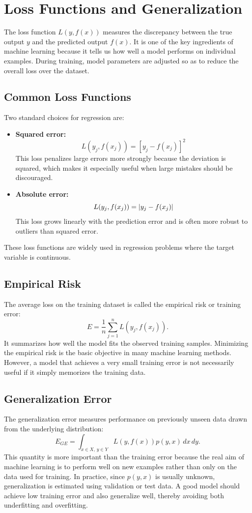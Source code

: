 \documentclass[english,12pt,a4paper]{report}
\begin{document}
	\section{Loss Functions and Generalization}
	\hspace{1.15em}The loss function $L(y,f(x))$ measures the discrepancy between the true output $y$ and the predicted output $f(x)$. It is one of the key ingredients of machine learning because it tells us how well a model performs on individual examples. During training, model parameters are adjusted so as to reduce the overall loss over the dataset.
	
	\subsection{Common Loss Functions}
	\hspace{1.15em}Two standard choices for regression are:
	\begin{itemize}
		\item \textbf{Squared error:} \[L(y_j,f(x_j))=[y_j-f(x_j)]^2\]
		This loss penalizes large errors more strongly because the deviation is squared, which makes it especially useful when large mistakes should be discouraged.
		\item \textbf{Absolute error:} \[L(y_j,f(x_j))=\abs{y_j-f(x_j)}\]
		This loss grows linearly with the prediction error and is often more robust to outliers than squared error.
	\end{itemize}
	These loss functions are widely used in regression problems where the target variable is continuous.
	
	\subsection{Empirical Risk}
	\hspace{1.15em}The average loss on the training dataset is called the empirical risk or training error:
	\[
	E=\frac{1}{n}\sum_{j=1}^{n}L(y_j,f(x_j)).
	\]
	It summarizes how well the model fits the observed training samples. Minimizing the empirical risk is the basic objective in many machine learning methods. However, a model that achieves a very small training error is not necessarily useful if it simply memorizes the training data.
	
	\subsection{Generalization Error}
	\hspace{1.15em}The generalization error measures performance on previously unseen data drawn from the underlying distribution:
	\[
	E_{GE}=\int_{x\in X,\,y\in Y}L(y,f(x))p(y,x)\,dx\,dy.
	\]
	This quantity is more important than the training error because the real aim of machine learning is to perform well on new examples rather than only on the data used for training. In practice, since $p(y,x)$ is usually unknown, generalization is estimated using validation or test data. A good model should achieve low training error and also generalize well, thereby avoiding both underfitting and overfitting.
	
\end{document}
